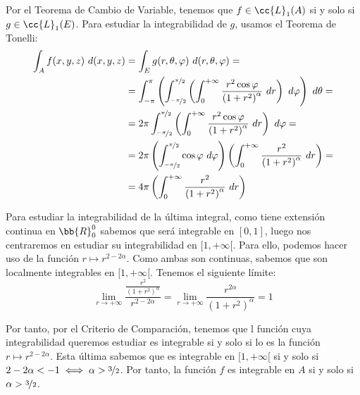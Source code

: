\begin{ejercicio}
\begin{enumerate}
        Por el Teorema de Cambio de Variable, tenemos que $f\in \cc{L}_1(A)$ si y solo si $g\in \cc{L}_1(E)$. Para estudiar la integrabilidad de $g$, usamos el Teorema de Tonelli:
        \begin{align*}
            \int_A f(x, y, z)~d(x, y, z) &= \int_E g(r, \theta, \varphi)~d(r, \theta, \varphi) =\\
            &= \int_{-\pi}^\pi \left( \int_{\nicefrac{-\pi}{2}}^{\nicefrac{\pi}{2}} \left( \int_0^{+\infty} \frac{r^2\cos\varphi}{\left(1 + r^2\right)^\alpha}~dr \right)~d\varphi \right)~d\theta =\\
            &= 2\pi \int_{\nicefrac{-\pi}{2}}^{\nicefrac{\pi}{2}} \left( \int_0^{+\infty} \frac{r^2\cos\varphi}{\left(1 + r^2\right)^\alpha}~dr \right)~d\varphi =\\
            &= 2\pi \left(\int_{\nicefrac{-\pi}{2}}^{\nicefrac{\pi}{2}} \cos\varphi~d\varphi\right) \left(\int_0^{+\infty} \frac{r^2}{\left(1 + r^2\right)^\alpha}~dr\right) =\\
            &= 4\pi \left(\int_0^{+\infty} \frac{r^2}{\left(1 + r^2\right)^\alpha}~dr\right)
        \end{align*}

        Para estudiar la integrabilidad de la última integral, como tiene extensión continua en $\bb{R}^0_0$ sabemos que será integrable en $[0,1]$,
        luego nos centraremos en estudiar su integrabilidad en $[1,+\infty[$. Para ello,
        podemos hacer uso de la función $r\mapsto r^{2-2\alpha}$.
        Como ambas son continuas, sabemos que son localmente integrables en $[1,+\infty[$. Tenemos el siguiente límite:
        \begin{equation*}
            \lim_{r\to+\infty} \dfrac{\frac{r^2}{\left(1 + r^2\right)^\alpha}}{r^{2-2\alpha}}
            = \lim_{r\to+\infty} \dfrac{r^{2\alpha}}{\left(1 + r^2\right)^\alpha} = 1
        \end{equation*}

        Por tanto, por el Criterio de Comparación, tenemos que l función cuya integrabilidad queremos estudiar es integrable si y solo si lo es la función $r\mapsto r^{2-2\alpha}$.
        Esta última sabemos que es integrable en $[1,+\infty[$ si y solo si $2-2\alpha < -1 \iff \alpha > \nicefrac{3}{2}$.
        Por tanto, la función $f$ es integrable en $A$ si y solo si $\alpha > \nicefrac{3}{2}$.
    \end{enumerate}
\end{ejercicio}

